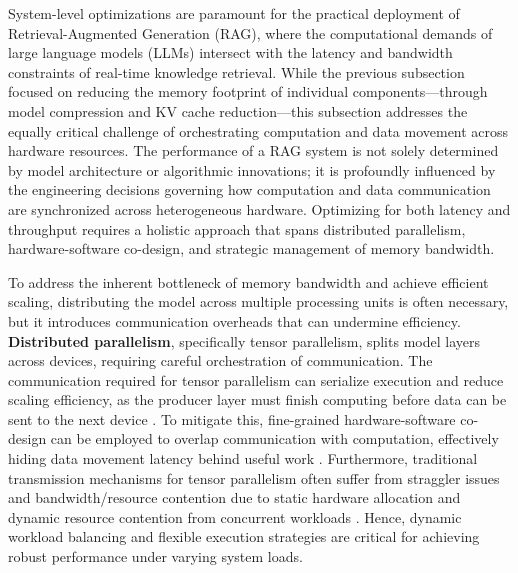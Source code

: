 \documentclass[11pt]{article}
\begin{document}
System-level optimizations are paramount for the practical deployment of Retrieval-Augmented Generation (RAG), where the computational demands of large language models (LLMs) intersect with the latency and bandwidth constraints of real-time knowledge retrieval. While the previous subsection focused on reducing the memory footprint of individual components---through model compression and KV cache reduction---this subsection addresses the equally critical challenge of orchestrating computation and data movement across hardware resources. The performance of a RAG system is not solely determined by model architecture or algorithmic innovations; it is profoundly influenced by the engineering decisions governing how computation and data communication are synchronized across heterogeneous hardware. Optimizing for both latency and throughput requires a holistic approach that spans distributed parallelism, hardware-software co-design, and strategic management of memory bandwidth.

To address the inherent bottleneck of memory bandwidth and achieve efficient scaling, distributing the model across multiple processing units is often necessary, but it introduces communication overheads that can undermine efficiency. \textbf{Distributed parallelism}, specifically tensor parallelism, splits model layers across devices, requiring careful orchestration of communication. The communication required for tensor parallelism can serialize execution and reduce scaling efficiency, as the producer layer must finish computing before data can be sent to the next device \cite{ref311}. To mitigate this, fine-grained hardware-software co-design can be employed to overlap communication with computation, effectively hiding data movement latency behind useful work \cite{ref311}. Furthermore, traditional transmission mechanisms for tensor parallelism often suffer from straggler issues and bandwidth/resource contention due to static hardware allocation and dynamic resource contention from concurrent workloads \cite{ref312}. Hence, dynamic workload balancing and flexible execution strategies are critical for achieving robust performance under varying system loads.
\end{document}
